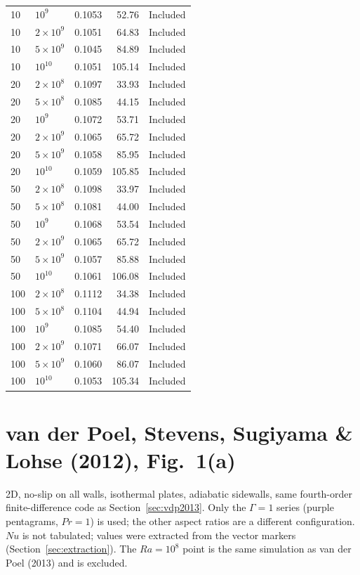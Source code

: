 \documentclass[11pt]{article}
\begin{document}
\begin{longtable}{l l r r l}
\rowcolor{included} 10 & $10^{9}$ & 0.1053 & 52.76 & Included \\
\rowcolor{included} 10 & $2\times10^{9}$ & 0.1051 & 64.83 & Included \\
\rowcolor{included} 10 & $5\times10^{9}$ & 0.1045 & 84.89 & Included \\
\rowcolor{included} 10 & $10^{10}$ & 0.1051 & 105.14 & Included \\
\rowcolor{included} 20 & $2\times10^{8}$ & 0.1097 & 33.93 & Included \\
\rowcolor{included} 20 & $5\times10^{8}$ & 0.1085 & 44.15 & Included \\
\rowcolor{included} 20 & $10^{9}$ & 0.1072 & 53.71 & Included \\
\rowcolor{included} 20 & $2\times10^{9}$ & 0.1065 & 65.72 & Included \\
\rowcolor{included} 20 & $5\times10^{9}$ & 0.1058 & 85.95 & Included \\
\rowcolor{included} 20 & $10^{10}$ & 0.1059 & 105.85 & Included \\
\rowcolor{included} 50 & $2\times10^{8}$ & 0.1098 & 33.97 & Included \\
\rowcolor{included} 50 & $5\times10^{8}$ & 0.1081 & 44.00 & Included \\
\rowcolor{included} 50 & $10^{9}$ & 0.1068 & 53.54 & Included \\
\rowcolor{included} 50 & $2\times10^{9}$ & 0.1065 & 65.72 & Included \\
\rowcolor{included} 50 & $5\times10^{9}$ & 0.1057 & 85.88 & Included \\
\rowcolor{included} 50 & $10^{10}$ & 0.1061 & 106.08 & Included \\
\rowcolor{included} 100 & $2\times10^{8}$ & 0.1112 & 34.38 & Included \\
\rowcolor{included} 100 & $5\times10^{8}$ & 0.1104 & 44.94 & Included \\
\rowcolor{included} 100 & $10^{9}$ & 0.1085 & 54.40 & Included \\
\rowcolor{included} 100 & $2\times10^{9}$ & 0.1071 & 66.07 & Included \\
\rowcolor{included} 100 & $5\times10^{9}$ & 0.1060 & 86.07 & Included \\
\rowcolor{included} 100 & $10^{10}$ & 0.1053 & 105.34 & Included \\
\end{longtable}

\section{van der Poel, Stevens, Sugiyama \& Lohse (2012), Fig.~1(a)}\label{sec:vdp2012}
2D, no-slip on all walls, isothermal plates, adiabatic sidewalls, same
fourth-order finite-difference code as Section~\ref{sec:vdp2013}. Only the
$\Gamma=1$ series (purple pentagrams, $Pr=1$) is used; the other aspect
ratios are a different configuration. $Nu$ is not tabulated; values were
extracted from the vector markers (Section~\ref{sec:extraction}). The
$Ra=10^8$ point is the same simulation as van der Poel (2013) and is
excluded.
\end{document}
